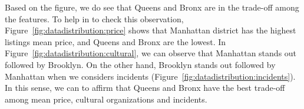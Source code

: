 \documentclass[sigconf]{acmart}
\begin{document}


Based on the figure, we do see that Queens and Bronx are in the trade-off among the features. To help in to check this observation, Figure~\ref{fig:datadistribution:price} shows that Manhattan district has the highest listings mean price, and Queens and Bronx are the lowest. In Figure~\ref{fig:datadistribution:cultural}, we can observe that Manhattan stands out followed by Brooklyn. On the other hand, Brooklyn stands out followed by Manhattan when we considers incidents (Figure~\ref{fig:datadistribution:incidents}). In this sense, we can to affirm that Queens and Bronx have the best trade-off among mean price, cultural organizations and incidents.
\end{document}
